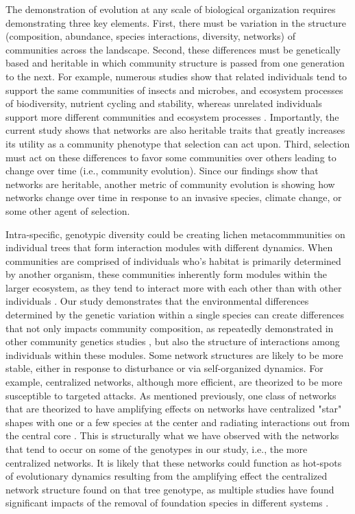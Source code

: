 \documentclass[fleqn,12pt]{olplainarticle}
\begin{document}
The demonstration of evolution at any scale of biological organization
requires demonstrating three key elements. First, there must be
variation in the structure (composition, abundance, species
interactions, diversity, networks) of communities across the
landscape. Second, these differences must be genetically based and
heritable in which community structure is passed from one generation
to the next. For example, numerous studies show that related
individuals tend to support the same communities of insects and
microbes, and ecosystem processes of biodiversity, nutrient cycling
and stability, whereas unrelated individuals support more different
communities and ecosystem processes \citep{DesRoches2018TheVariation,
  Whitham2020IntraspecificEvolution}. Importantly, the current study
shows that networks are also heritable traits that greatly increases
its utility as a community phenotype that selection can act
upon. Third, selection must act on these differences to favor some
communities over others leading to change over time (i.e., community
evolution). Since our findings show that networks are heritable,
another metric of community evolution is showing how networks change
over time in response to an invasive species, climate change, or some
other agent of selection. 

Intra-specific, genotypic diversity could be creating lichen
metacommmunities on individual trees that form interaction modules
with different dynamics. When communities are comprised of individuals
who's habitat is primarily determined by another organism, these
communities inherently form modules within the larger ecosystem, as
they tend to interact more with each other than with other individuals
\citep{Lau2017a}. Our study demonstrates that the environmental
differences determined by the genetic variation within a single
species can create differences that not only impacts community
composition, as repeatedly demonstrated in other community genetics
studies \citep{Whitham2006a, DesRoches2018TheVariation}, but also the
structure of interactions among individuals within these modules.
Some network structures are likely to be more stable, either in
response to disturbance or via self-organized dynamics. For example,
centralized networks, although more efficient, are theorized to be
more susceptible to targeted attacks. As mentioned previously, one
class of networks that are theorized to have amplifying effects on
networks have centralized "star" shapes with one or a few species at
the center and radiating interactions out from the central core
\citep{Lleberman2005EvolutionaryGraphs}. This is structurally what we
have observed with the networks that tend to occur on some of the
genotypes in our study, i.e., the more centralized networks. It is
likely that these networks could function as hot-spots of evolutionary
dynamics resulting from the amplifying effect the centralized network
structure found on that tree genotype, as multiple studies have found
significant impacts of the removal of foundation species in different
systems \citep{Keith2017, DesRoches2018TheVariation}.
\end{document}
